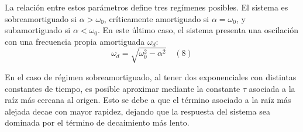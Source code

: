 La relación entre estos parámetros define tres regímenes posibles. El sistema es sobreamortiguado si $\alpha > \omega_0$, críticamente amortiguado si $\alpha = \omega_0$, y subamortiguado si $\alpha < \omega_0$. En este último caso, el sistema presenta una oscilación con una frecuencia propia amortiguada $\omega_d$:
\[ \omega_d = \sqrt{\omega_0^2 - \alpha^2} \quad (8)\]

En el caso de régimen sobreamortiguado, al tener dos exponenciales con distintas constantes de tiempo, es posible aproximar mediante la constante $\tau$ asociada a la raíz más cercana al origen. Esto se debe a que el término asociado a la raíz más alejada decae con mayor rapidez, dejando que la respuesta del sistema sea dominada por el término de decaimiento más lento. 
\newpage
